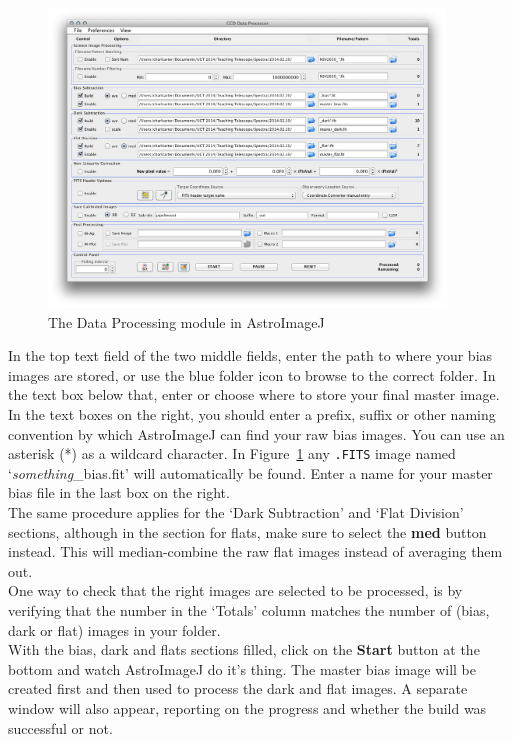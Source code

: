 \documentclass[12pt,twoside,a4paper]{report}
\begin{document}
\begin{figure}[ht]
  \centering
    \includegraphics[width=0.94\textwidth]{documentation_images/AIJ_DPwindow.jpg}
    \caption{\label{fig:AIJ_DP}The Data Processing module in AstroImageJ}
 \end{figure}

In the top text field of the two middle fields, enter the path to where your bias images are stored, or use the blue folder icon to browse to the correct folder. In the text box below that, enter or choose where to store your final master image. In the text boxes on the right, you should enter a prefix, suffix or other naming convention by which AstroImageJ can find your raw bias images. You can use an asterisk (*) as a wildcard character. In Figure~\ref{fig:AIJ_DP} any {\tt .FITS} image named `\emph{something}\_bias.fit' will automatically be found. Enter a name for your master bias file in the last box on the right.\\

The same procedure applies for the `Dark Subtraction' and `Flat Division' sections, although in the section for flats, make sure to select the \textbf{med} button instead. This will median-combine the raw flat images instead of averaging them out.\\

One way to check that the right images are selected to be processed, is by verifying that the number in the `Totals' column matches the number of (bias, dark or flat) images in your folder.\\

With the bias, dark and flats sections filled, click on the \textbf{Start} button at the bottom and watch AstroImageJ do it's thing. The master bias image will be created first and then used to process the dark and flat images. A separate window will also appear, reporting on the progress and whether the build was successful or not.\\
\end{document}
